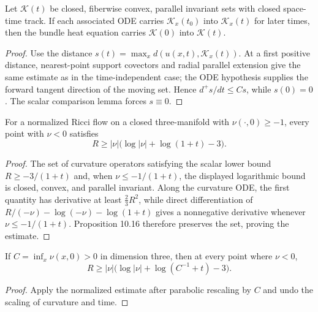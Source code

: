 \begin{theorem}
\label{thm:chow-ii-time-dependent-system-wmp}


Let $\mathcal K(t)$ be closed, fiberwise convex, parallel invariant sets with
closed space-time track.  If each associated ODE carries $\mathcal K_x(t_0)$ into
$\mathcal K_x(t)$ for later times, then the bundle heat equation carries
$\mathcal K(0)$ into $\mathcal K(t)$.
\end{theorem}
\begin{proof}
\sketch
{}
Use the distance $s(t)=\max_xd(u(x,t),\mathcal K_x(t))$.  At a first positive
distance, nearest-point support covectors and radial parallel extension give the
same estimate as in the time-independent case; the ODE hypothesis supplies the
forward tangent direction of the moving set.  Hence $d^+s/dt\le Cs$, while
$s(0)=0$.  The scalar comparison lemma forces $s\equiv0$.
\end{proof}

\begin{theorem}
\label{thm:chow-ii-hamilton-ivey}


For a normalized Ricci flow on a closed three-manifold with
$\nu(\cdot,0)\ge-1$, every point with $\nu<0$ satisfies
\[
R\ge|\nu|\bigl(\log|\nu|+\log(1+t)-3\bigr).
\]
\end{theorem}
\begin{proof}
\sketch
{}
The set of curvature operators satisfying the scalar lower bound
$R\ge-3/(1+t)$ and, when $\nu\le-1/(1+t)$, the displayed logarithmic bound is
closed, convex, and parallel invariant.  Along the curvature ODE, the first
quantity has derivative at least $\frac23R^2$, while direct differentiation of
\(R/(-\nu)-\log(-\nu)-\log(1+t)\) gives a nonnegative derivative whenever
$\nu\le-1/(1+t)$.  Proposition 10.16 therefore preserves the set, proving the
estimate.
\end{proof}

\begin{corollary}
\label{cor:chow-ii-hamilton-ivey-scaling}


If $C=\inf_x\nu(x,0)>0$ in dimension three, then at every point where
$\nu<0$,
\[
R\ge|\nu|\bigl(\log|\nu|+\log(C^{-1}+t)-3\bigr).
\]
\end{corollary}
\begin{proof}
\sketch
Apply the normalized estimate after parabolic rescaling by $C$ and undo the
scaling of curvature and time.
\end{proof}


